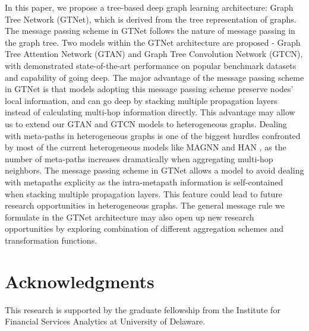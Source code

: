 \documentclass[lettersize,journal]{IEEEtran}
\theoremstyle{plain}
\theoremstyle{definition}
\theoremstyle{remark}
\begin{document}
In this paper, we propose a tree-based deep graph learning architecture: Graph Tree Network (GTNet), which is derived from the tree representation of graphs. The message passing scheme in GTNet follows the nature of message passing in the graph tree. Two models within the GTNet architecture are proposed - Graph Tree Attention Network (GTAN) and Graph Tree Convolution Network (GTCN), with demonstrated state-of-the-art performance on popular benchmark datasets and capability of going deep. The major advantage of the message passing scheme in GTNet is that models adopting this message passing scheme preserve nodes' local information, and can go deep by stacking multiple propagation layers instead of calculating multi-hop information directly. This advantage may allow us to extend our GTAN and GTCN models to heterogeneous graphs. Dealing with meta-paths in heterogeneous graphs is one of the biggest hurdles confronted by most of the current heterogeneous models like MAGNN \citep{fu2020magnn} and HAN \citep{wang2019heterogeneous}, as the number of meta-paths increases dramatically when aggregating multi-hop neighbors. The message passing scheme in GTNet allows a model to avoid dealing with metapaths explicity as the intra-metapath information is self-contained when stacking multiple propagation layers. This feature could lead to future research opportunities in heterogeneous graphs. The general message rule we formulate in the GTNet architecture may also open up new research opportunities by exploring combination of different aggregation schemes and transformation functions.

\section*{Acknowledgments}
This research is supported by the graduate fellowship from the Institute for Financial Services Analytics at University of Delaware.
\end{document}
